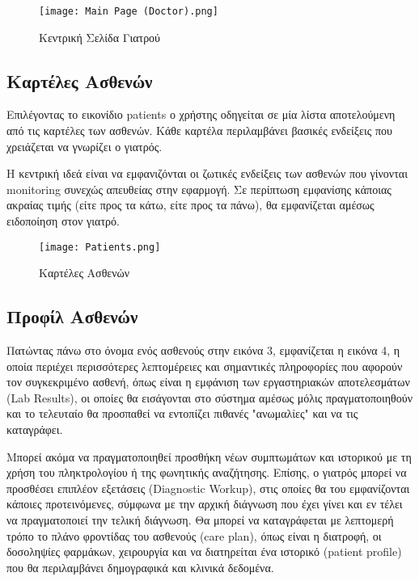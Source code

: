 \documentclass{article}
\begin{document}
\vspace{0.3cm}

\begin{figure}[!htb]
\centering
\texttt{[image: Main Page (Doctor).png]}
\caption{\label{fig:main page} Κεντρική Σελίδα Γιατρού}
\end{figure}


\subsection{Καρτέλες Ασθενών}

Επιλέγοντας το εικονίδιο patients ο χρήστης οδηγείται σε μία λίστα αποτελούμενη από τις καρτέλες των ασθενών. Κάθε καρτέλα περιλαμβάνει βασικές ενδείξεις που χρειάζεται να γνωρίζει ο γιατρός. \par
Η κεντρική ιδεά είναι να εμφανιζόνται οι ζωτικές ενδείξεις των ασθενών που γίνονται monitoring συνεχώς απευθείας στην εφαρμογή. Σε περίπτωση εμφανίσης κάποιας ακραίας τιμής (είτε προς τα κάτω, είτε προς τα πάνω), θα εμφανίζεται αμέσως ειδοποίηση στον γιατρό. 

\vspace{0.3cm}

\begin{figure}[!htb]
\centering
\texttt{[image: Patients.png]}
\caption{\label{fig:patients cards} Καρτέλες Ασθενών}
\end{figure}

\newpage

\subsection{Προφίλ Ασθενών}

Πατώντας πάνω στο όνομα ενός ασθενούς στην εικόνα 3, εμφανίζεται η εικόνα 4, η οποία περιέχει περισσότερες λεπτομέρειες και σημαντικές πληροφορίες που αφορούν τον συγκεκριμένο ασθενή, όπως είναι η εμφάνιση των εργαστηριακών αποτελεσμάτων (Lab Results), οι οποίες θα εισάγονται στο σύστημα αμέσως μόλις πραγματοποιηθούν και το τελευταίο θα προσπαθεί να εντοπίζει πιθανές "ανωμαλίες" και να τις καταγράφει. \par
Μπορεί ακόμα να πραγματοποιηθεί προσθήκη νέων συμπτωμάτων και ιστορικού με τη χρήση του πληκτρολογίου ή της φωνητικής αναζήτησης. Επίσης, ο γιατρός μπορεί να προσθέσει επιπλέον εξετάσεις (Diagnostic Workup), στις οποίες θα του εμφανίζονται κάποιες προτεινόμενες, σύμφωνα με την αρχική διάγνωση που έχει γίνει και εν τέλει να πραγματοποιεί την τελική διάγνωση.
Θα μπορεί να καταγράφεται με λεπτομερή τρόπο το πλάνο φροντίδας του ασθενούς (care plan), όπως είναι η διατροφή, οι δοσοληψίες φαρμάκων, χειρουργία και να διατηρείται ένα ιστορικό (patient profile) που θα περιλαμβάνει δημογραφικά και κλινικά δεδομένα.
\end{document}
